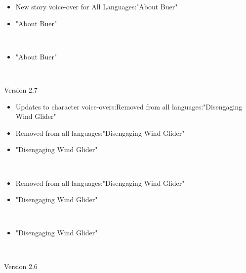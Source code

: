 \documentclass[a4paper,12pt]{article}
\begin{document}
\begin{itemize}
\item New story voice-over for All Languages:"About Buer"
\item "About Buer"
\end{itemize}\\ \par \vspace{0.5cm}

\begin{itemize}
\item "About Buer"
\end{itemize}\\ \par \vspace{0.5cm}

Version 2.7\\ \par \vspace{0.5cm}

\begin{itemize}
\item Updates to character voice-overs:Removed from all languages:"Disengaging Wind Glider"
\item Removed from all languages:"Disengaging Wind Glider"
\item "Disengaging Wind Glider"
\end{itemize}\\ \par \vspace{0.5cm}

\begin{itemize}
\item Removed from all languages:"Disengaging Wind Glider"
\item "Disengaging Wind Glider"
\end{itemize}\\ \par \vspace{0.5cm}

\begin{itemize}
\item "Disengaging Wind Glider"
\end{itemize}\\ \par \vspace{0.5cm}

Version 2.6\\ \par \vspace{0.5cm}
\end{document}
